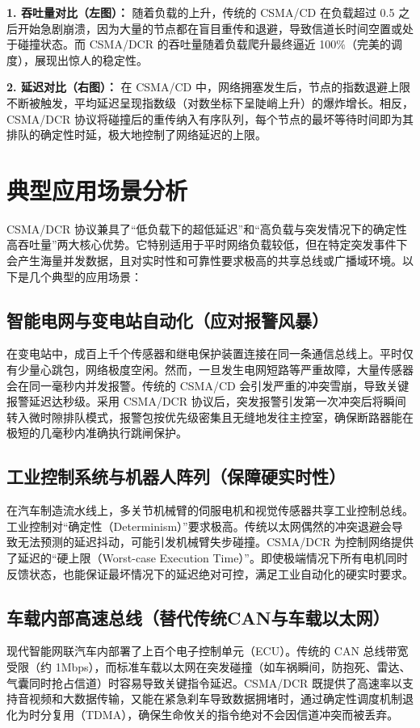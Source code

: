 \documentclass[12pt]{article}
\begin{document}
\textbf{1. 吞吐量对比（左图）：}
随着负载的上升，传统的 CSMA/CD 在负载超过 0.5 之后开始急剧崩溃，因为大量的节点都在盲目重传和退避，导致信道长时间空置或处于碰撞状态。而 CSMA/DCR 的吞吐量随着负载爬升最终逼近 100\%（完美的调度），展现出惊人的稳定性。

\textbf{2. 延迟对比（右图）：}
在 CSMA/CD 中，网络拥塞发生后，节点的指数退避上限不断被触发，平均延迟呈现指数级（对数坐标下呈陡峭上升）的爆炸增长。相反，CSMA/DCR 协议将碰撞后的重传纳入有序队列，每个节点的最坏等待时间即为其排队的确定性时延，极大地控制了网络延迟的上限。

\section{典型应用场景分析}
CSMA/DCR 协议兼具了“低负载下的超低延迟”和“高负载与突发情况下的确定性高吞吐量”两大核心优势。它特别适用于平时网络负载较低，但在特定突发事件下会产生海量并发数据，且对实时性和可靠性要求极高的共享总线或广播域环境。以下是几个典型的应用场景：

\subsection{智能电网与变电站自动化（应对报警风暴）}
在变电站中，成百上千个传感器和继电保护装置连接在同一条通信总线上。平时仅有少量心跳包，网络极度空闲。然而，一旦发生电网短路等严重故障，大量传感器会在同一毫秒内并发报警。传统的 CSMA/CD 会引发严重的冲突雪崩，导致关键报警延迟达秒级。采用 CSMA/DCR 协议后，突发报警引发第一次冲突后将瞬间转入微时隙排队模式，报警包按优先级密集且无缝地发往主控室，确保断路器能在极短的几毫秒内准确执行跳闸保护。

\subsection{工业控制系统与机器人阵列（保障硬实时性）}
在汽车制造流水线上，多关节机械臂的伺服电机和视觉传感器共享工业控制总线。工业控制对“确定性（Determinism）”要求极高。传统以太网偶然的冲突退避会导致无法预测的延迟抖动，可能引发机械臂失步碰撞。CSMA/DCR 为控制网络提供了延迟的“硬上限（Worst-case Execution Time）”。即使极端情况下所有电机同时反馈状态，也能保证最坏情况下的延迟绝对可控，满足工业自动化的硬实时要求。

\subsection{车载内部高速总线（替代传统CAN与车载以太网）}
现代智能网联汽车内部署了上百个电子控制单元（ECU）。传统的 CAN 总线带宽受限（约 1Mbps），而标准车载以太网在突发碰撞（如车祸瞬间，防抱死、雷达、气囊同时抢占信道）时容易导致关键指令延迟。CSMA/DCR 既提供了高速率以支持音视频和大数据传输，又能在紧急刹车导致数据拥堵时，通过确定性调度机制退化为时分复用（TDMA），确保生命攸关的指令绝对不会因信道冲突而被丢弃。
\end{document}
